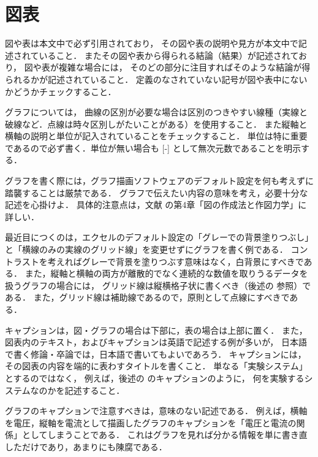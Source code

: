 \section{図表}

図や表は本文中で必ず引用されており，
その図や表の説明や見方が本文中で記述されていること．
またその図や表から得られる結論（結果）が記述されており，
図や表が複雑な場合には，
そのどの部分に注目すればそのような結論が得られるかが記述されていること．
定義のなされていない記号が図や表中にないかどうかチェックすること．

グラフについては，
曲線の区別が必要な場合は区別のつきやすい線種（実線と破線など．点線は時々区別しがたいことがある）を使用すること．
また縦軸と横軸の説明と単位が記入されていることをチェックすること．
単位は特に重要であるので必ず書く．単位が無い場合も [-] として無次元数であることを明示する．

グラフを書く際には，グラフ描画ソフトウェアのデフォルト設定を何も考えずに踏襲することは厳禁である．
グラフで伝えたい内容の意味を考え，必要十分な記述を心掛けよ．
具体的注意点は，文献 \Cite{04} の第4章「図の作成法と作図力学」に詳しい．

最近目につくのは，エクセルのデフォルト設定の「グレーでの背景塗りつぶし」と「横線のみの実線のグリッド線」を変更せずにグラフを書く例である．
コントラストを考えればグレーで背景を塗りつぶす意味はなく，白背景にすべきである．
また，縦軸と横軸の両方が離散的でなく連続的な数値を取りうるデータを扱うグラフの場合には，
グリッド線は縦横格子状に書くべき（後述の  参照）である．
また，グリッド線は補助線であるので，原則として点線にすべきである．

キャプションは，図・グラフの場合は下部に，表の場合は上部に置く．
また，図表内のテキスト，およびキャプションは英語で記述する例が多いが，
日本語で書く修論・卒論では，日本語で書いてもよいであろう．
キャプションには，その図表の内容を端的に表わすタイトルを書くこと．
単なる「実験システム」とするのではなく，
例えば，後述の  のキャプションのように，
何を実験するシステムなのかを記述すること．

グラフのキャプションで注意すべきは，意味のない記述である．
例えば，横軸を電圧，縦軸を電流として描画したグラフのキャプションを「電圧と電流の関係」としてしまうことである．
これはグラフを見れば分かる情報を単に書き直しただけであり，あまりにも陳腐である．


